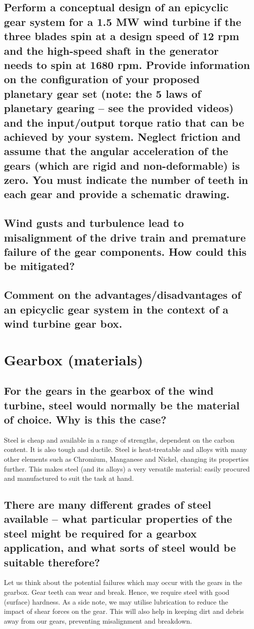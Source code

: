 \documentclass[12pt]{article}
\numberwithin{equation}{section}
\begin{document}
\begin{flushleft}
\subsection{Perform a conceptual design of an epicyclic gear system for a 1.5 MW wind turbine if the three blades spin at a design speed of 12 rpm and the high-speed shaft in the generator needs to spin at 1680 rpm. Provide information on the configuration of your proposed planetary gear set (note: the 5 laws of planetary gearing – see the provided videos) and the input/output torque ratio that can be achieved by your system. Neglect friction and assume that the angular acceleration of the gears (which are rigid and non-deformable) is zero. You must indicate the number of teeth in each gear and provide a schematic drawing.}
\subsection{Wind gusts and turbulence lead to misalignment of the drive train and premature failure of the gear components. How could this be mitigated?}
\subsection{Comment on the advantages/disadvantages of an epicyclic gear system in the context of a wind turbine gear box.}

\section{Gearbox (materials)}
\subsection{For the gears in the gearbox of the wind turbine, steel would normally be the material of choice. Why is this the case?}
Steel is cheap and available in a range of strengths, dependent on the carbon content. It is also tough and ductile. Steel is heat-treatable and alloys with many other elements such as Chromium, Manganese and Nickel, changing its properties further. This makes steel (and its alloys) a very versatile material: easily procured and manufactured to suit the task at hand.
\subsection{There are many different grades of steel available – what particular properties of the steel might be required for a gearbox application, and what sorts of steel would be suitable therefore?}
Let us think about the potential failures which may occur with the gears in the gearbox. Gear teeth can wear and break. Hence, we require steel with good (surface) hardness. As a side note, we may utilise lubrication to reduce the impact of shear forces on the gear. This will also help in keeping dirt and debris away from our gears, preventing misalignment and breakdown.


\end{flushleft}
\end{document}
